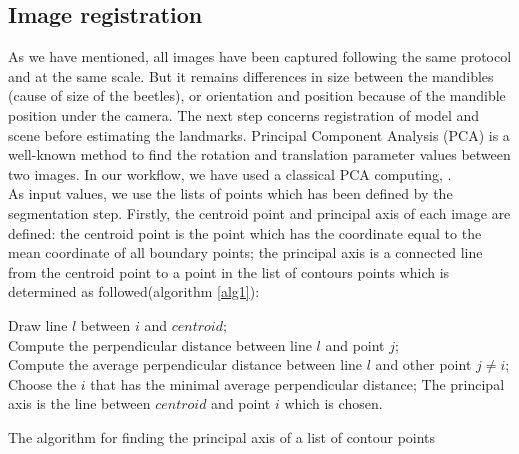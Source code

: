 \documentclass[twoside,twocolumn,10pt]{article}
\begin{document}
\subsection{Image registration}
As we have mentioned, all images have been captured following the same protocol and at the same scale. But it remains differences in size between the mandibles (cause of size of the beetles), or orientation and position because of the mandible position under the camera. The next step concerns registration of model and scene before estimating the landmarks. Principal Component Analysis (PCA) is a well-known method to find the rotation and translation parameter values between two images. In our workflow, we have used a classical PCA computing\cite{bsspca}, \cite{shlens2014tutorial}.\\

As input values, we use the lists of points which has been defined by the segmentation step. Firstly, the centroid point and principal axis of each image are defined: the centroid point is the point which has the coordinate equal to the mean coordinate of all boundary points; the principal axis is a connected line from the centroid point to a point in the list of contours points which is determined as followed(algorithm \ref{alg1}):
\begin{algorithm}
	{
		Draw line $l$ between $i$ and $centroid$;\\
		{
			{
				Compute the perpendicular distance between line $l$ and point $j$;\\
			}		
		}
		Compute the average perpendicular distance between line $l$ and other point $j \neq i$;\\
		Choose the $i$ that has the minimal average perpendicular distance;
	}
	The principal axis is the line between $centroid$ and point $i$ which is chosen.
	\caption{The algorithm for finding the principal axis of a list of contour points}
	\label{alg1}
\end{algorithm}\\
\end{document}
